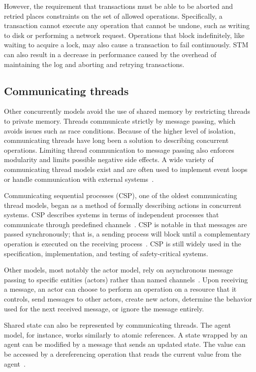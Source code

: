\documentclass{sig-alternate}
\begin{document}
However, the requirement that transactions must be able to be aborted and retried places constraints on the set of allowed operations. Specifically, a transaction cannot execute any operation that cannot be undone, such as writing to disk or performing a network request. Operations that block indefinitely, like waiting to acquire a lock, may also cause a transaction to fail continuously. STM can also result in a decrease in performance caused by the overhead of maintaining the log and aborting and retrying transactions.

\subsection{Communicating threads}

Other concurrently models avoid the use of shared memory by restricting threads to private memory. Threads communicate strictly by message passing, which avoids issues such as race conditions. Because of the higher level of isolation, communicating threads have long been a solution to describing concurrent operations. Limiting thread communication to message passing also enforces modularity and limits possible negative side effects. A wide variety of communicating thread models exist and are often used to implement event loops or handle communication with external systems~\cite{Swalens2014}.

Communicating sequential processes (CSP), one of the oldest communicating thread models, began as a method of formally describing actions in concurrent systems. CSP describes systems in terms of independent processes that communicate through predefined channels~\cite{Hoare1978}. CSP is notable in that messages are passed synchronously; that is, a sending process will block until a complementary operation is executed on the receiving process~\cite{Swalens2014}. CSP is still widely used in the specification, implementation, and testing of safety-critical systems.

Other models, most notably the actor model, rely on asynchronous message passing to specific entities (actors) rather than named channels~\cite{Agha1986}. Upon receiving a message, an actor can choose to perform an operation on a resource that it controls, send messages to other actors, create new actors, determine the behavior used for the next received message, or ignore the message entirely.

Shared state can also be represented by communicating threads. The agent model, for instance, works similarly to atomic references. A state wrapped by an agent can be modified by a message that sends an updated state. The value can be accessed by a dereferencing operation that reads the current value from the agent~\cite{Swalens2014}.
\end{document}
